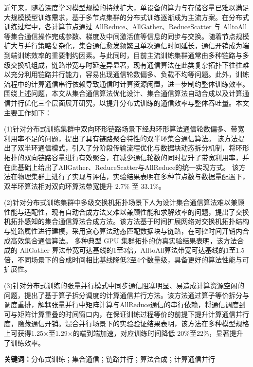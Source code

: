 \cleardoublepage
{}

近年来，随着深度学习模型规模的持续扩大，单设备的算力与存储容量已难以满足大规模模型训练需求，基于多节点集群的分布式训练逐渐成为主流方案。在分布式训练过程中，各计算节点通过 AllReduce、AllGather、ReduceScatter 与 AlltoAll 等集合通信操作完成参数、梯度及中间激活值等信息的同步与交换。随着节点规模扩大与并行策略复杂化，集合通信愈发频繁且单次通信时间延长，通信开销成为端到端训练效率的重要制约因素。与此同时，目前主流训练集群通常由多种链路与多级交换机组成，链路带宽与时延差异显著，现有通信算法在此类复杂拓扑下往往难以充分利用链路并行能力，容易出现通信轮数偏多、负载不均等问题。此外，训练流程中的计算通信串行依赖导致通信时计算资源闲置，进一步制约整体训练效率。围绕上述问题，本文从集合通信算法优化设计、集合通信算法自动合成以及计算通信并行优化三个层面展开研究，以提升分布式训练的通信效率与整体吞吐量。本文主要工作如下：

(1)针对分布式训练集群中双向环形链路场景下经典环形算法通信轮数偏多、带宽利用率不足的问题，提出了具有链路聚合特性的双半环集合通信算法。
该方法提出了双半环通信模式，引入了分阶段传输流程优化与数据块动态拆分机制，将环形拓扑的双向链路容量进行有效聚合，在减少通信轮数的同时提升了带宽利用率，并在此基础上给出了AllGather、ReduceScatter与AllReduce的统一实现方式。
该方法在物理集群上进行了实现与评估，实验结果表明在多种节点数与数据量配置下，双半环算法相对双向环算法带宽提升 2.7\% 至 33.1\%。


(2)针对分布式训练集群中多级交换机拓扑场景下人为设计集合通信算法难以兼顾性能与适配性，现有自动合成方法又难以兼顾性能和求解效率的问题，提出了交换机拓扑感知的集合通信算法合成方法。该方法基于时间扩展网络对交换机拓扑结构与链路属性进行建模，采用贪心算法动态匹配数据块与链路，在可控时间开销内合成高效集合通信算法。
多种典型 GPU 集群拓扑的仿真实验结果表明，该方法合成的 AllGather 算法带宽可达基线的1至3倍，AlltoAll算法带宽可达基线的1至1.5倍，不同场景下的合成时间相比基线降低2至4个数量级，具备更好的算法性能与可扩展性。

(3)针对分布式训练的张量并行模式中同步通信阻塞明显、易造成计算资源空闲的问题，提出了基于算子拆分调度的计算通信并行方法。该方法通过算子等价拆分与调度重排，解耦张量并行中矩阵计算与AllReduce通信的串行依赖，将通信调度到可与矩阵计算重叠的时间窗口内，在保证训练过程等价的前提下提升计算通信并行度，隐藏通信开销。混合并行场景下的实验验证结果表明，该方法在多种模型规格上可获得1.25$\times$至1.29$\times$的端到端加速，对应训练时间降低 20\%至22\%，显著提升了训练效率。

\noindent \textbf{关键词：}分布式训练；集合通信；链路并行；算法合成；计算通信并行

